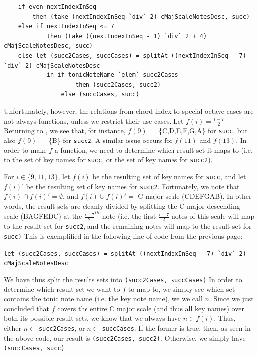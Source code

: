 \documentclass{report}
\begin{document}
\begin{verbatim}
    if even nextIndexInSeq 
        then (take (nextIndexInSeq `div` 2) cMajScaleNotesDesc, succ)
    else if nextIndexInSeq <= 7
            then (take ((nextIndexInSeq - 1) `div` 2 + 4) cMajScaleNotesDesc, succ)
    else let (succ2Cases, succCases) = splitAt ((nextIndexInSeq - 7) `div` 2) cMajScaleNotesDesc
            in if tonicNoteName `elem` succ2Cases 
                    then (succ2Cases, succ2) 
                else (succCases, succ)
\end{verbatim}

Unfortunately, however, the relations from chord index to special octave cases are not always functions, unless we restrict their use cases. Let $f(i) = \frac{i-7}{2}$ Returning to , we see that, for instance, $f(9) =$ \{C,D,E,F,G,A\} for \verb.succ., but also $f(9) =$ \{B\} for \verb.succ2.. A similar issue occurs for $f(11)$ and $f(13)$. In order to make $f$ a function, we need to determine which result set it maps to (i.e. to the set of key names for \verb.succ., or the set of key names for \verb.succ2.). 

For $i \in \{9,11,13\}$, let $f(i)$ be the resulting set of key names for \verb.succ., and let $f(i)$' be the resulting set of key names for \verb.succ2.. Fortunately, we note that $f(i) \cap f(i)' = \emptyset$, and $f(i) \cup f(i)' = $ C major scale (CDEFGAB). In other words, the result sets are cleanly divided by splitting the C major descending scale (BAGFEDC) at the $\frac{i-7}{2}^{th}$ note (i.e. the first $\frac{i-7}{2}$ notes of this scale will map to the result set for  \verb.succ2., and the remaining notes will map to the result set for \verb.succ). This is exemplified in the following line of code from the previous page:

\verb.let (succ2Cases, succCases) = splitAt ((nextIndexInSeq - 7) `div` 2) cMajScaleNotesDesc.

We have thus split the results sets into \verb.(succ2Cases, succCases). In order to determine which result set we want to $f$ to map to, we simply see which set contains  the  tonic note name (i.e. the key note name), we we call $n$. Since we just concluded that $f$  covers the entire C major scale (and thus all key names) over both its possible result sets, we know that we always have  $n \in f(i)$. Thus, either $n \in$ \verb.succ2Cases., or $n \in$ \verb.succCases.. If the former is true, then, as seen in the above code, our result is \verb.(succ2Cases, succ2).. Otherwise, we simply have \verb.(succCases, succ). 
\end{document}
